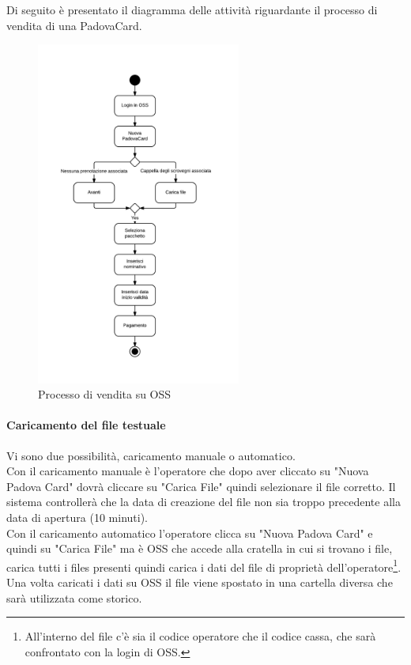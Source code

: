 
Di seguito è presentato il diagramma delle attività riguardante il processo di vendita di una PadovaCard. 
\begin{figure}[H]
\centering
\includegraphics[width=0.6\textwidth]{images/tdocumentos.png}
\caption{Processo di vendita su OSS}
\end{figure}

\paragraph{Caricamento del file testuale}

Vi sono due possibilità, caricamento manuale o automatico.\\
Con il caricamento manuale è l'operatore che dopo aver cliccato su "Nuova Padova Card" dovrà cliccare su "Carica File" quindi selezionare il file corretto.
Il sistema controllerà che la data di creazione del file non sia troppo precedente alla data di apertura (10 minuti). \\

Con il caricamento automatico l'operatore clicca su "Nuova Padova Card" e quindi su "Carica File" ma è OSS che accede alla cratella in cui si trovano i file, carica tutti i files presenti quindi carica i dati del file di proprietà dell'operatore\footnote{All'interno del file c'è sia il codice operatore che il codice cassa, che sarà confrontato con la login di OSS.}. Una volta caricati i dati su OSS il file viene spostato in una cartella diversa che sarà utilizzata come storico.\\ 

